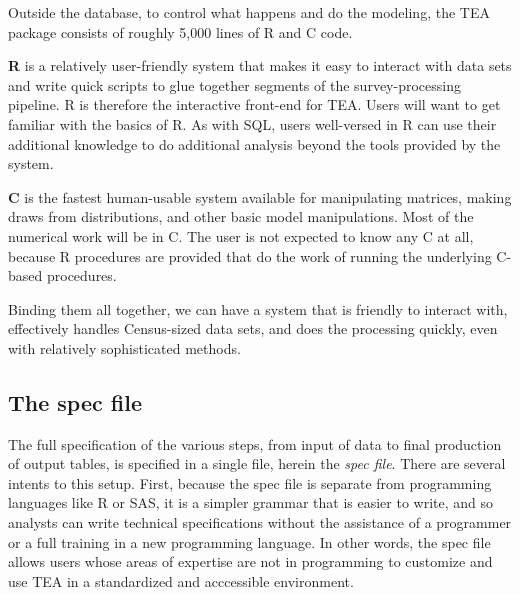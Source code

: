 \documentclass{article}
\begin{document}
Outside the database, to control what happens and
do the modeling, the TEA package consists of roughly 5,000 lines of R and C code.
\comment{

}

{\bf R} is a relatively user-friendly system that makes it easy to interact with data
sets and write quick scripts to glue together segments of the survey-processing pipeline.
R is therefore the interactive front-end for TEA. Users will want to get familiar with the basics of
R.  As with SQL, users well-versed in R can use their additional knowledge to do additional
analysis beyond the tools provided by the system.

{\bf C} is the fastest human-usable system available for manipulating matrices, making
draws from distributions, and other basic model manipulations. Most of the numerical
work will be in C. The user is not expected to know any C at all, because R procedures
are provided that do the work of running the underlying C-based procedures.

Binding them all together, we can have a system that is friendly to interact with, effectively handles Census-sized data sets, and does the processing quickly, even with relatively sophisticated methods.


\subsection{The spec file} \label{specsec}
The full specification of the various steps, from input of data to final production of
output tables, is specified in a single file, herein the {\em spec file}. There are
several intents to this setup. First, because the spec file is separate from programming
languages like R or SAS, it is a simpler grammar that is easier to write, and so 
analysts can write technical specifications without the assistance of a programmer or
a full training in a new programming language. In other words, the spec file allows 
users whose areas of expertise are not in programming to customize and use TEA in a 
standardized and acccessible environment. 
\end{document}
